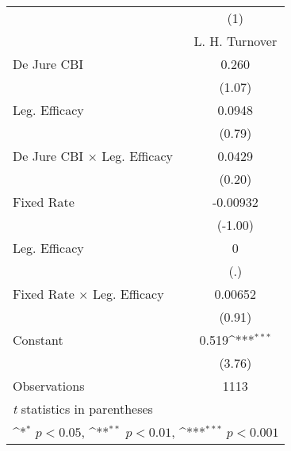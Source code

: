 \begin{table}[htbp]\centering
\def\sym#1{\ifmmode^{#1}\else\(^{#1}\)\fi}
\caption{\label{llpFEDJ}}
\begin{tabular}{l*{1}{c}}
\toprule
                                        &\multicolumn{1}{c}{(1)}\\
                                        &\multicolumn{1}{c}{L. H. Turnover}\\
\midrule
De Jure CBI                             &    0.260         \\
                                        &   (1.07)         \\
\addlinespace
Leg. Efficacy                           &   0.0948         \\
                                        &   (0.79)         \\
\addlinespace
De Jure CBI $\times$ Leg. Efficacy      &   0.0429         \\
                                        &   (0.20)         \\
\addlinespace
Fixed Rate                              & -0.00932         \\
                                        &  (-1.00)         \\
\addlinespace
Leg. Efficacy                           &        0         \\
                                        &      (.)         \\
\addlinespace
Fixed Rate $\times$ Leg. Efficacy       &  0.00652         \\
                                        &   (0.91)         \\
\addlinespace
Constant                                &    0.519\sym{***}\\
                                        &   (3.76)         \\
\midrule
Observations                            &     1113         \\
\bottomrule
\multicolumn{2}{l}{\footnotesize \textit{t} statistics in parentheses}\\
\multicolumn{2}{l}{\footnotesize \sym{*} \(p<0.05\), \sym{**} \(p<0.01\), \sym{***} \(p<0.001\)}\\
\end{tabular}
\end{table}
